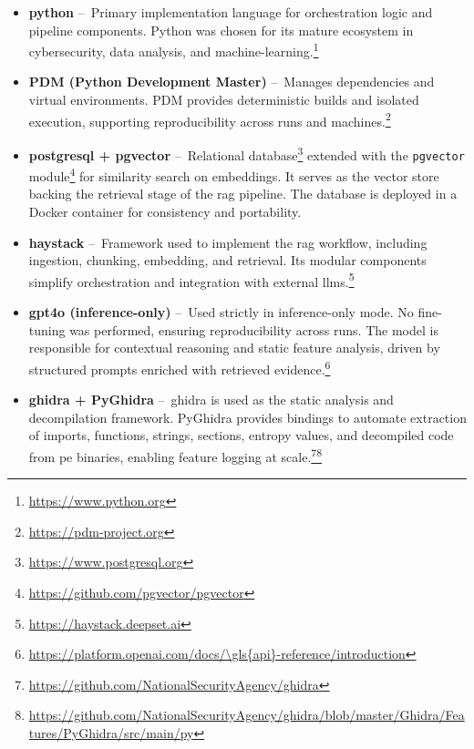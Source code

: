 \begin{itemize}
      \item \textbf{\gls{python}} --~Primary implementation language for orchestration logic and
            pipeline components. Python was chosen for its mature ecosystem in cybersecurity, data analysis,
            and \gls{machine-learning}.\footnote{\url{https://www.python.org}}

      \item \textbf{PDM (Python Development Master)} --~Manages dependencies and virtual
            environments. PDM provides deterministic builds and isolated execution, supporting reproducibility
            across runs and machines.\footnote{\url{https://pdm-project.org}}

      \item \textbf{\gls{postgresql} + \gls{pgvector}} --~Relational database\footnote{\url{https://www.postgresql.org}}
            extended with the \texttt{pgvector} module\footnote{\url{https://github.com/pgvector/pgvector}} for
            similarity search on embeddings. It serves as the vector store backing the retrieval stage of the
            \gls{rag} pipeline. The database is deployed in a Docker container for consistency and portability.

      \item \textbf{\gls{haystack}} --~Framework used to implement the \gls{rag} workflow, including
            ingestion, chunking, embedding, and retrieval. Its modular components simplify orchestration and
            integration with external \glspl{llm}.\footnote{\url{https://haystack.deepset.ai}}

      \item \textbf{\gls{gpt4o} (inference-only)} --~Used strictly in inference-only mode. No fine-tuning
            was performed, ensuring reproducibility across runs. The model is responsible for contextual
            reasoning and static feature analysis, driven by structured prompts enriched with retrieved
            evidence.\footnote{\url{https://platform.openai.com/docs/\gls{api}-reference/introduction}}

      \item \textbf{\gls{ghidra} + PyGhidra} --~\gls{ghidra} is used as the static analysis and
            decompilation framework. PyGhidra provides bindings to automate extraction of imports,
            functions, strings, sections, entropy values, and decompiled code from \gls{pe} binaries,
            enabling feature logging at scale.\footnote{\url{https://github.com/NationalSecurityAgency/ghidra}}\footnote{\url{https://github.com/NationalSecurityAgency/ghidra/blob/master/Ghidra/Features/PyGhidra/src/main/py}}


\end{itemize}
